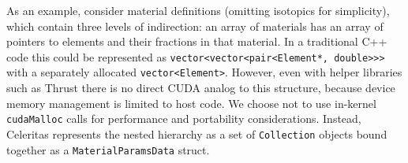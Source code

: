 As an example, consider material definitions (omitting isotopics for
simplicity), which contain three levels of indirection: an array of
materials has an array of pointers to elements and their fractions in
that material. In a traditional C++ code this could be represented as
\texttt{vector\textless{}vector\textless{}pair\textless{}Element*,\ double\textgreater{}\textgreater{}\textgreater{}}
with a separately allocated
\texttt{vector\textless{}Element\textgreater{}}. However, even with helper
libraries such as Thrust \cite{thrust} there is no direct CUDA analog to this
structure, because device memory management is limited to host code.
We choose not to use in-kernel \texttt{cudaMalloc} calls for
performance and portability considerations. Instead, Celeritas
represents the nested hierarchy as a set of \texttt{Collection} objects
bound together as a \texttt{MaterialParamsData} struct.
%
\begin{Shaded}
\begin{Highlighting}[]
\NormalTok{\{}
\NormalTok{\};}

\NormalTok{\{}
\NormalTok{\};}

\NormalTok{\{}
\NormalTok{\};}

\NormalTok{\{}
    \NormalTok{\textless{}}

     

\NormalTok{=(}
\NormalTok{\};}
\end{Highlighting}
\end{Shaded}

